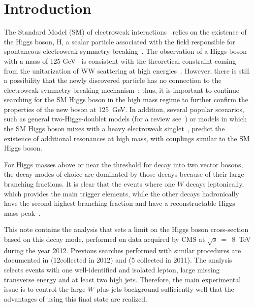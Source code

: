 \section{Introduction}
\label{sec:intro}
The Standard Model (SM) of electroweak
interactions~\cite{StandardModel67_1,StandardModel67_2,StandardModel67_3}
relies on the existence of the Higgs boson, H, a scalar particle
associated with the field responsible for spontaneous electroweak
symmetry
breaking~\cite{Englert:1964et,Higgs:1964ia,Higgs:1964pj,Guralnik:1964eu,Higgs:1966ev,Kibble:1967sv}.
The observation of a Higgs boson with a mass of 125
GeV~\cite{Chatrchyan:2012ufa,Aad:2012tfa} is consistent with the
theoretical constraint coming from the unitarization of WW scattering
at high
energies~\cite{Dicus:1992vj,Veltman:1976rt,Lee:1977eg,Lee:1977yc,Passarino:1990hk,Chanowitz:1985hj,Duncan:1985vj,Dicus:1986jg,Bagger:1995mk,Ballestrero:2009vw}.
However, there is still a possibility that the newly discovered
particle has no connection to the electroweak symmetry breaking
mechanism~\cite{Low:2011gn,Low:2012rj}; thus, it is important to
continue searching for the SM Higgs boson in the high mass regime to
further confirm the properties of the new boson at 125~GeV. In
addition, several popular scenarios, such as general two-Higgs-doublet
models (for a review see~\cite{Branco:2011iw}) or models in which the
SM Higgs boson mixes with a heavy electroweak
singlet~\cite{Patt:2006fw,PhysRevD.77.035005,PhysRevD.77.117701,PhysRevD.79.095002,Bock201044,Fox:2011qc,Englert:2011yb,PhysRevD.85.035008,Batell:2011pz,Englert:2011aa,Gupta:2011gd,Dolan:2012ac,Bertolini:2012gu,Batell:2012mj},
predict the existence of additional resonances at high mass, with
couplings similar to the SM Higgs boson.

For Higgs masses above or near the threshold for decay into two vector
bosons, the decay modes of choice are dominated by those decays
because of their large branching fractions.  It is clear that the
events where one $W$ decays leptonically, which provides the main
trigger elements, while the other decays hadronically have the second
highest branching fraction and have a reconstructable Higgs mass
peak~\cite{intro2}.

This note contains the analysis that sets a limit on the Higgs boson
cross-section based on this decay mode, performed on data acquired by
CMS at $\sqrt{s}~=$~8~TeV during the year 2012. Previous searches
performed with similar procedures are documented in \cite{HIG-12-046}
(12\fbinv collected in 2012) and \cite{HIG-12-003} (5\fbinv
collected in 2011).  The analysis selects events with one
well-identified and isolated lepton, large missing transverse energy
and at least two high \pt jets.  Therefore, the main experimental
issue is to control the large $W$ plus jets background sufficiently
well that the advantages of using this final state are realized.

